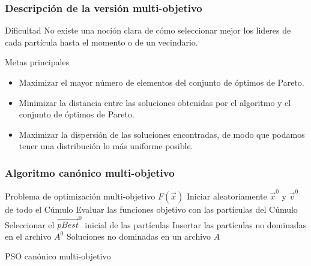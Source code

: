 \documentclass[10pt,compress]{beamer}
\begin{document}
\begin{frame}
	\frametitle{Descripci\'on de la versi\'on multi-objetivo}	
	\begin{block}{Dificultad}
			No existe una noci\'on clara de c\'omo seleccionar mejor los lideres de cada part\'icula hasta el momento o de un vecindario.
  \end{block}
	
	\begin{block}{Metas principales}
		\begin{itemize}
   \item Maximizar el mayor n\'umero de elementos del conjunto de \'optimos de Pareto.
   \item Minimizar la distancia entre las soluciones obtenidas por el algoritmo y el conjunto de \'optimos de Pareto.
   \item Maximizar la dispersi\'on de las soluciones encontradas, de modo que podamos tener una distribuci\'on lo m\'as uniforme posible.	
  \end{itemize}
  \end{block}
\end{frame}

\begin{frame}
	\frametitle{Algoritmo can\'onico multi-objetivo}
	   \begin{algorithm}[H]
				Problema de optimizaci\'on multi-objetivo $F\left(\vec{x}\right)$\;	
				Iniciar aleatoriamente $\vec{x}^0$ y $\vec{v}^0$ de todo el C\'umulo\;							
				Evaluar las funciones objetivo con las part\'iculas del C\'umulo\;
				Seleccionar el $\vec{pBest}^0$ inicial de las part\'iculas\;
				Insertar las part\'iculas no dominadas en el archivo $A^{0}$\;
	\Return Soluciones no dominadas en un archivo $A$\;
		\caption{PSO can\'onico multi-objetivo}
\end{algorithm}
\end{frame}
\end{document}
